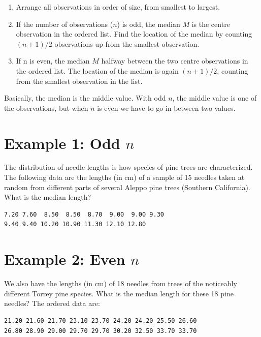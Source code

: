 \documentclass[
  letterpaper,
  DIV=11,
  numbers=noendperiod]{scrreprt}
\providecommand{\tightlist}{%
  \setlength{\itemsep}{0pt}\setlength{\parskip}{0pt}}\usepackage{longtable,booktabs,array}
\begin{document}
\begin{enumerate}
\def\labelenumi{\arabic{enumi}.}
\tightlist
\item
  Arrange all observations in order of size, from smallest to largest.
\item
  If the number of observations (\(n\)) is odd, the median \(M\) is the
  centre observation in the ordered list. Find the location of the
  median by counting \((n + 1)/2\) observations up from the smallest
  observation.
\item
  If n is even, the median \(M\) halfway between the two centre
  observations in the ordered list. The location of the median is again
  \((n + 1)/2\), counting from the smallest observation in the list.
\end{enumerate}

Basically, the median is the middle value. With odd \(n\), the middle
value is one of the observations, but when \(n\) is even we have to go
in between two values.

\hypertarget{example-1-odd-n}{%
\section{\texorpdfstring{Example 1: Odd
\(n\)}{Example 1: Odd n}}\label{example-1-odd-n}}

The distribution of needle lengths is how species of pine trees are
characterized. The following data are the lengths (in cm) of a sample of
15 needles taken at random from different parts of several Aleppo pine
trees (Southern California). What is the median length?

\begin{verbatim}
7.20 7.60  8.50  8.50  8.70  9.00  9.00 9.30
9.40 9.40 10.20 10.90 11.30 12.10 12.80
\end{verbatim}

\hypertarget{example-2-even-n}{%
\section{\texorpdfstring{Example 2: Even
\(n\)}{Example 2: Even n}}\label{example-2-even-n}}

We also have the lengths (in cm) of 18 needles from trees of the
noticeably different Torrey pine species. What is the median length for
these 18 pine needles? The ordered data are:

\begin{verbatim}
21.20 21.60 21.70 23.10 23.70 24.20 24.20 25.50 26.60
26.80 28.90 29.00 29.70 29.70 30.20 32.50 33.70 33.70
\end{verbatim}
\end{document}
